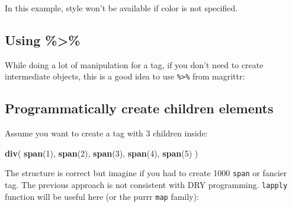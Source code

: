 \documentclass[]{book}
\newenvironment{Shaded}{\begin{snugshade}}{\end{snugshade}}
\newcommand{\DataTypeTok}[1]{\textcolor[rgb]{0.13,0.29,0.53}{#1}}
\newcommand{\DecValTok}[1]{\textcolor[rgb]{0.00,0.00,0.81}{#1}}
\newcommand{\KeywordTok}[1]{\textcolor[rgb]{0.13,0.29,0.53}{\textbf{#1}}}
\newcommand{\NormalTok}[1]{#1}
\newcommand{\OperatorTok}[1]{\textcolor[rgb]{0.81,0.36,0.00}{\textbf{#1}}}
\newcommand{\StringTok}[1]{\textcolor[rgb]{0.31,0.60,0.02}{#1}}
\begin{document}
In this example, style won't be available if color is not specified.

\hypertarget{using}{%
\subsection{Using \%\textgreater{}\%}\label{using}}

While doing a lot of manipulation for a tag, if you don't need to create intermediate
objects, this is a good idea to use \texttt{\%\textgreater{}\%} from magrittr:

\begin{Shaded}
\end{Shaded}

\hypertarget{programmatically-create-children-elements}{%
\subsection{Programmatically create children elements}\label{programmatically-create-children-elements}}

Assume you want to create a tag with 3 children inside:

\begin{Shaded}
\begin{Highlighting}[]
\KeywordTok{div}\NormalTok{(}
  \KeywordTok{span}\NormalTok{(}\DecValTok{1}\NormalTok{),}
  \KeywordTok{span}\NormalTok{(}\DecValTok{2}\NormalTok{),}
  \KeywordTok{span}\NormalTok{(}\DecValTok{3}\NormalTok{),}
  \KeywordTok{span}\NormalTok{(}\DecValTok{4}\NormalTok{),}
  \KeywordTok{span}\NormalTok{(}\DecValTok{5}\NormalTok{)}
\NormalTok{)}
\end{Highlighting}
\end{Shaded}

The structure is correct but imagine if you had to create 1000 \texttt{span} or fancier tag. The previous approach is not consistent with DRY programming. \texttt{lapply} function will be useful here (or the purrr \texttt{map} family):
\end{document}
